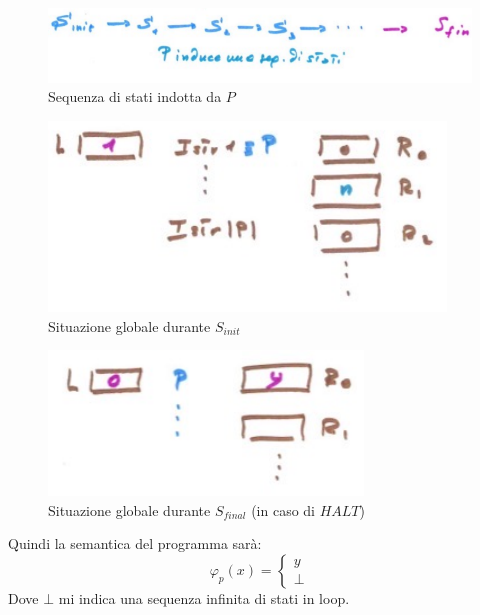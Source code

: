 \documentclass{article}
\begin{document}
\begin{figure}[H]
    \centering
    \includegraphics[scale=0.5]{images/stati_seq.png}
    \caption{Sequenza di stati indotta da $P$}
\end{figure}
\begin{figure}[H]
    \centering
    \includegraphics[scale=0.5]{images/stato_init.png}
    \caption{Situazione globale durante $S_{init}$}
\end{figure}
\begin{figure}[H]
    \centering
    \includegraphics[scale=0.5]{images/stato_fina.png}
    \caption{Situazione globale durante $S_{final}$ (in caso di $HALT$)}
\end{figure}
Quindi la semantica del programma sarà:
\[
    \varphi_p(x) =
    \begin{cases}
        y \\
        \bot
    \end{cases}
\]
Dove $\bot$ mi indica una sequenza infinita di stati in loop.
\end{document}
